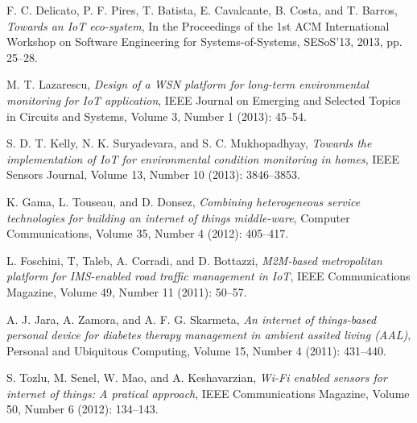 \documentclass[conference]{IEEEtran}
\begin{document}
%
%
%
\begin{thebibliography}{1}


F. C. Delicato, P. F. Pires,  T. Batista, E. Cavalcante, B. Costa, and  T. Barros, \emph{Towards an IoT eco-system}, In the Proceedings of the 1st ACM International Workshop on Software Engineering for Systems-of-Systems, SESoS’13, 2013, pp. 25--28.


M. T. Lazarescu, \emph{Design of a WSN platform for long-term environmental monitoring for IoT application}, IEEE Journal on Emerging and Selected Topics in Circuits and Systems, Volume 3, Number 1 (2013): 45--54.



S. D. T. Kelly, N. K. Suryadevara, and S. C. Mukhopadhyay, \emph{Towards the implementation of IoT for environmental condition monitoring in homes}, IEEE Sensors Journal, Volume 13, Number 10 (2013): 3846--3853.

K. Gama, L. Touseau, and D. Donsez, \emph{Combining heterogeneous service technologies for building an internet of things middle-ware}, Computer Communications, Volume 35, Number 4 (2012): 405--417.


L. Foschini, T, Taleb, A. Corradi, and D. Bottazzi, \emph{M2M-based metropolitan platform for IMS-enabled road traffic management in IoT}, IEEE Communications Magazine, Volume 49, Number 11 (2011): 50--57.


A. J. Jara, A. Zamora, and A. F. G. Skarmeta, \emph{An internet of things-based personal device for diabetes therapy management in ambient assited living (AAL)}, Personal and Ubiquitous Computing, Volume 15, Number 4 (2011): 431--440.




S. Tozlu, M. Senel, W. Mao, and A. Keshavarzian, \emph{Wi-Fi enabled sensors for internet of things: A pratical approach}, IEEE Communications Magazine, Volume 50, Number 6 (2012): 134--143.


\end{thebibliography}
\end{document}
